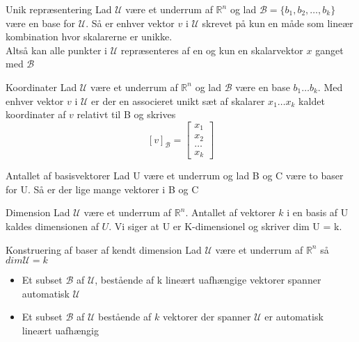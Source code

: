 \documentclass[a4paper,fleqn]{article}
\newcommand{\RR}{\mathbb{R}}
\newcommand{\U}{\mathcal{U}}
\newcommand{\B}{\mathcal{B}}
\begin{document}
	\begin{theorem}{Unik repræsentering}{}
		Lad $\U$ være et underrum af $\RR^n$ og lad $\B = \{b_1, b_2, \dots, b_k\}$ være
		en base for $\U$. Så er enhver vektor $v$ i $\U$ skrevet på kun en måde som lineær
		kombination hvor skalarerne er unikke.\\
		Altså kan alle punkter i $\U$ repræsenteres af en og kun en skalarvektor $x$ ganget
		med $\B$
	\end{theorem}
	\begin{definition}{Koordinater}{}
		Lad $\U$ være et underrum af $\RR^n$ og lad $\B$ være en base $b_1 \dots b_k$.
		Med enhver vektor $v$ i $\U$ er der en associeret unikt sæt af skalarer $x_1 \dots
		x_k$ kaldet koordinater af $v$ relativt til B og skrives
		\[ [v]_\B = \begin{bmatrix}x_1\\x_2\\\dots\\x_k\end{bmatrix}\]
	\end{definition}
	\begin{theorem}{Antallet af basisvektorer}{}
		Lad U være et underrum og lad B og C være to baser for U. Så er der lige mange
		vektorer i B og C
	\end{theorem}
	\begin{definition}{Dimension}{}
		Lad $\U$ være et underrum af $\RR^n$. Antallet af vektorer $k$ i en basis af U
		kaldes dimensionen af $U$. Vi siger at U er K-dimensionel og skriver dim U = k.
	\end{definition}
	\begin{theorem}{Konstruering af baser af kendt dimension}{}
		Lad $\U$ være et underrum af $\RR^n$ så $dim \U = k$
		\begin{itemize}
			\item Et subset $\B$ af $\U$, bestående af k lineært uafhængige vektorer 
				spanner automatisk $\U$ 
			\item Et subset $\B$ af $\U$ bestående af $k$ vektorer der spanner $\U$ er 
				automatisk lineært uafhængig
		\end{itemize}
	\end{theorem}
\end{document}
